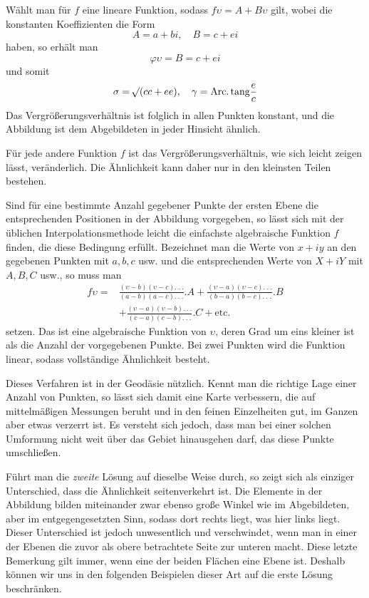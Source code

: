 Wählt man für \(f\) eine lineare Funktion, sodass \(f\upsilon=A+B\upsilon\) gilt, wobei die konstanten Koeffizienten die Form
\[
A=a+bi,\quad B=c+ei
\]
\noindent haben, so erhält man
\[
\varphi\upsilon=B=c+ei
\]
\noindent und somit
\[
\sigma=\mathord{{}^{}\!\surd}(cc+ee),\quad\gamma=\mathrm{Arc.}\,\mathrm{tang}\frac{e}{c}
\]
\noindent Das Vergrößerungsverhältnis ist folglich in allen Punkten konstant, und die Abbildung ist dem Abgebildeten in jeder Hinsicht ähnlich.

Für jede andere Funktion \(f\) ist das Vergrößerungsverhältnis, wie sich leicht zeigen lässt, veränderlich. Die Ähnlichkeit kann daher nur in den kleinsten Teilen bestehen.

Sind für eine bestimmte Anzahl gegebener Punkte der ersten Ebene die entsprechenden Positionen in der Abbildung vorgegeben, so lässt sich mit der üblichen Interpolationsmethode leicht die einfachste algebraische Funktion \(f\) finden, die diese Bedingung erfüllt. Bezeichnet man die Werte von \(x+iy\) an den gegebenen Punkten mit \(a,b,c\) usw. und die entsprechenden Werte von \(X+iY\) mit \(A,B,C\) usw., so muss man
\[
\begin{aligned}
f\upsilon={}&\frac{(\upsilon-b)(\upsilon-c).\ .\ .}{(a-b)(a-c).\ .\ .}\mathord{.}A
+\frac{(\upsilon-a)(\upsilon-c).\ .\ .}{(b-a)(b-c).\ .\ .}\mathord{.}B\\
&+\frac{(\upsilon-a)(\upsilon-b).\ .\ .}{(c-a)(c-b).\ .\ .}\mathord{.}C+\text{etc.}
\end{aligned}
\]
\noindent setzen. Das ist eine algebraische Funktion von \(\upsilon\), deren Grad um eins kleiner ist als die Anzahl der vorgegebenen Punkte. Bei zwei Punkten wird die Funktion linear, sodass vollständige Ähnlichkeit besteht.

Dieses Verfahren ist in der Geodäsie nützlich. Kennt man die richtige Lage einer Anzahl von Punkten, so lässt sich damit eine Karte verbessern, die auf mittelmäßigen Messungen beruht und in den feinen Einzelheiten gut, im Ganzen aber etwas verzerrt ist. Es versteht sich jedoch, dass man bei einer solchen Umformung nicht weit über das Gebiet hinausgehen darf, das diese Punkte umschließen.

Führt man die \textit{zweite} Lösung auf dieselbe Weise durch, so zeigt sich als einziger Unterschied, dass die Ähnlichkeit seitenverkehrt ist. Die Elemente in der Abbildung bilden miteinander zwar ebenso große Winkel wie im Abgebildeten, aber im entgegengesetzten Sinn, sodass
dort rechts liegt, was hier links liegt. Dieser Unterschied ist jedoch unwesentlich und verschwindet, wenn man in einer der Ebenen die zuvor als obere betrachtete Seite zur unteren macht. Diese letzte Bemerkung gilt immer, wenn eine der beiden Flächen eine Ebene ist. Deshalb können wir uns in den folgenden Beispielen dieser Art auf die erste Lösung beschränken.

